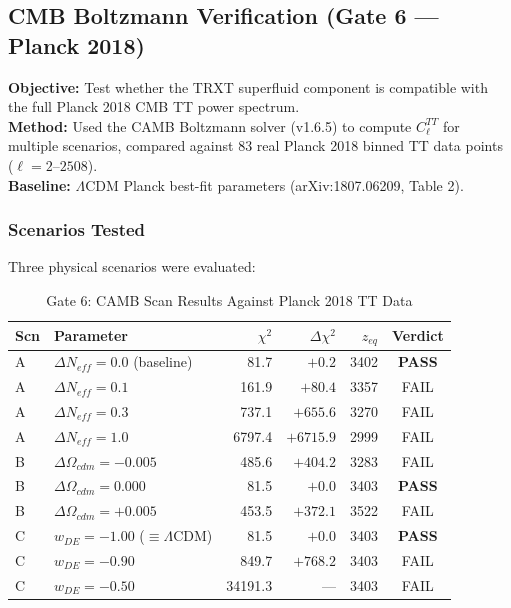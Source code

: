 \documentclass[a4paper,12pt]{article}
\begin{document}
\subsection{CMB Boltzmann Verification (Gate 6 --- Planck 2018)}

\textbf{Objective:} Test whether the TRXT superfluid component is compatible with the full Planck 2018 CMB TT power spectrum.\\
\textbf{Method:} Used the CAMB Boltzmann solver (v1.6.5) to compute $C_\ell^{TT}$ for multiple scenarios, compared against 83 real Planck 2018 binned TT data points ($\ell = 2$--$2508$).\\
\textbf{Baseline:} $\Lambda$CDM Planck best-fit parameters (arXiv:1807.06209, Table 2).

\subsubsection{Scenarios Tested}
Three physical scenarios were evaluated:

\begin{table}[H]
\centering
\caption{Gate 6: CAMB Scan Results Against Planck 2018 TT Data}
\label{tab:gate6}
\begin{tabular}{@{}llrrrc@{}}
\toprule
\textbf{Scn} & \textbf{Parameter} & \textbf{$\chi^2$} & \textbf{$\Delta\chi^2$} & \textbf{$z_{eq}$} & \textbf{Verdict} \\
\midrule
A & $\Delta N_{eff} = 0.0$ (baseline) & 81.7 & $+0.2$ & 3402 & \textbf{PASS} \\
A & $\Delta N_{eff} = 0.1$ & 161.9 & $+80.4$ & 3357 & FAIL \\
A & $\Delta N_{eff} = 0.3$ & 737.1 & $+655.6$ & 3270 & FAIL \\
A & $\Delta N_{eff} = 1.0$ & 6797.4 & $+6715.9$ & 2999 & FAIL \\
\midrule
B & $\Delta\Omega_{cdm} = -0.005$ & 485.6 & $+404.2$ & 3283 & FAIL \\
B & $\Delta\Omega_{cdm} = 0.000$ & 81.5 & $+0.0$ & 3403 & \textbf{PASS} \\
B & $\Delta\Omega_{cdm} = +0.005$ & 453.5 & $+372.1$ & 3522 & FAIL \\
\midrule
C & $w_{DE} = -1.00$ ($\equiv \Lambda$CDM) & 81.5 & $+0.0$ & 3403 & \textbf{PASS} \\
C & $w_{DE} = -0.90$ & 849.7 & $+768.2$ & 3403 & FAIL \\
C & $w_{DE} = -0.50$ & 34191.3 & --- & 3403 & FAIL \\
\bottomrule
\end{tabular}
\end{table}
\end{document}
